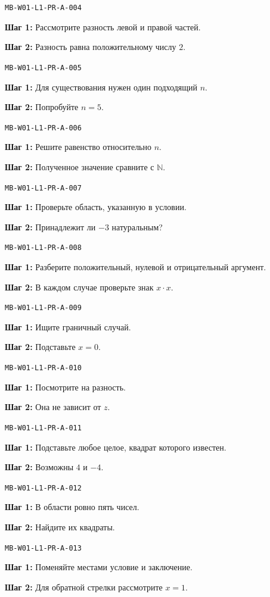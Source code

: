 \documentclass[11pt,a4paper,openany]{book}
\newcommand{\muid}[1]{\texttt{\footnotesize #1}}
\begin{document}
\noindent\muid{MB-W01-L1-PR-A-004}\par 
\textbf{Шаг 1:} Рассмотрите разность левой и правой частей.\par \textbf{Шаг 2:} Разность равна положительному числу $2$.\smallskip

\noindent\muid{MB-W01-L1-PR-A-005}\par 
\textbf{Шаг 1:} Для существования нужен один подходящий $n$.\par \textbf{Шаг 2:} Попробуйте $n=5$.\smallskip

\noindent\muid{MB-W01-L1-PR-A-006}\par 
\textbf{Шаг 1:} Решите равенство относительно $n$.\par \textbf{Шаг 2:} Полученное значение сравните с $\mathbb N$.\smallskip

\noindent\muid{MB-W01-L1-PR-A-007}\par 
\textbf{Шаг 1:} Проверьте область, указанную в условии.\par \textbf{Шаг 2:} Принадлежит ли $-3$ натуральным?\smallskip

\noindent\muid{MB-W01-L1-PR-A-008}\par 
\textbf{Шаг 1:} Разберите положительный, нулевой и отрицательный аргумент.\par \textbf{Шаг 2:} В каждом случае проверьте знак $x\cdot x$.\smallskip

\noindent\muid{MB-W01-L1-PR-A-009}\par 
\textbf{Шаг 1:} Ищите граничный случай.\par \textbf{Шаг 2:} Подставьте $x=0$.\smallskip

\noindent\muid{MB-W01-L1-PR-A-010}\par 
\textbf{Шаг 1:} Посмотрите на разность.\par \textbf{Шаг 2:} Она не зависит от $z$.\smallskip

\noindent\muid{MB-W01-L1-PR-A-011}\par 
\textbf{Шаг 1:} Подставьте любое целое, квадрат которого известен.\par \textbf{Шаг 2:} Возможны $4$ и $-4$.\smallskip

\noindent\muid{MB-W01-L1-PR-A-012}\par 
\textbf{Шаг 1:} В области ровно пять чисел.\par \textbf{Шаг 2:} Найдите их квадраты.\smallskip

\noindent\muid{MB-W01-L1-PR-A-013}\par 
\textbf{Шаг 1:} Поменяйте местами условие и заключение.\par \textbf{Шаг 2:} Для обратной стрелки рассмотрите $x=1$.\smallskip
\end{document}
